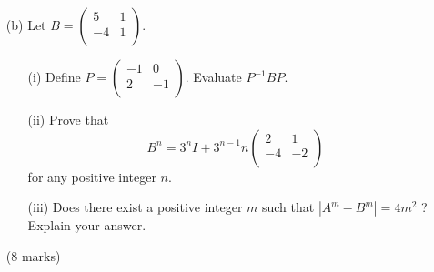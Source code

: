 \documentclass{report}
\begin{document}
\begin{enumerate}
\begin{enumerate}
		\item [(b)]Let $B = \begin{pmatrix}
			5 & 1\\
			-4 & 1\\
			\end{pmatrix}$. 
		\begin{enumerate}
			\item [(i)]Define $P = \begin{pmatrix}
			-1 & 0\\
			2 & -1\\
			\end{pmatrix}$. Evaluate $P^{-1}BP$.  
			\item [(ii)]Prove that $$B^n = 3^nI + 3^{n-1}n\begin{pmatrix}
			2&1\\-4&-2\\
			\end{pmatrix}$$ for any positive integer $n$.
			\item [(iii)]Does there exist a positive integer $m$ such that $|A^m - B^m| = 4m^2$ ? Explain your answer.
		\end{enumerate}
		(8 marks)
	\end{enumerate}	

\end{enumerate}
\end{document}
